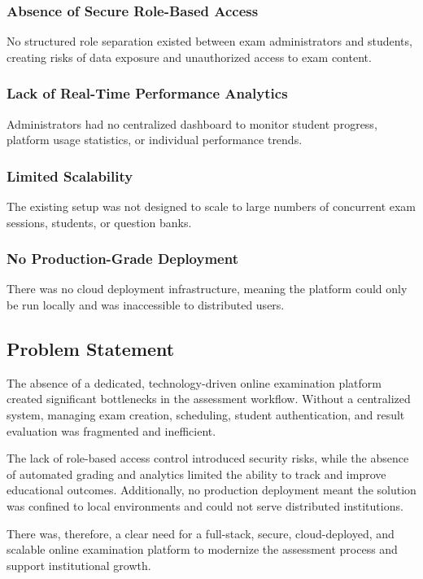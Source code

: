 \documentclass[12pt,a4paper]{article}
\begin{document}
\subsubsection{Absence of Secure Role-Based Access}
No structured role separation existed between exam administrators and students, creating risks of data exposure and unauthorized access to exam content.

\subsubsection{Lack of Real-Time Performance Analytics}
Administrators had no centralized dashboard to monitor student progress, platform usage statistics, or individual performance trends.

\subsubsection{Limited Scalability}
The existing setup was not designed to scale to large numbers of concurrent exam sessions, students, or question banks.

\subsubsection{No Production-Grade Deployment}
There was no cloud deployment infrastructure, meaning the platform could only be run locally and was inaccessible to distributed users.

\subsection{Problem Statement}

The absence of a dedicated, technology-driven online examination platform created significant bottlenecks in the assessment workflow. Without a centralized system, managing exam creation, scheduling, student authentication, and result evaluation was fragmented and inefficient.

The lack of role-based access control introduced security risks, while the absence of automated grading and analytics limited the ability to track and improve educational outcomes. Additionally, no production deployment meant the solution was confined to local environments and could not serve distributed institutions.

There was, therefore, a clear need for a full-stack, secure, cloud-deployed, and scalable online examination platform to modernize the assessment process and support institutional growth.
\end{document}
